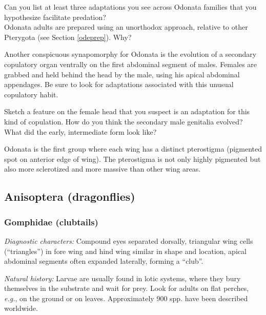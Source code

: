 \begin{theo}
{}Can you list at least three adaptations you see across Odonata families that you hypothesize facilitate predation?\\

\noindent{}Odonata adults are prepared using an unorthodox approach, relative to other Pterygota (see Section \ref{odeprep}). Why?
\end{theo}\vspace{3mm}

\noindent{}Another conspicuous synapomorphy for Odonata is the evolution of a secondary copulatory organ ventrally on the first abdominal segment of males. Females are grabbed and held behind the head by the male, using his apical abdominal appendages. Be sure to look for adaptations associated with this unusual copulatory habit.\vspace{3mm}

\begin{theo}
{}Sketch a feature on the female head that you suspect is an adaptation for this kind of copulation. How do you think the secondary male genitalia evolved? What did the early, intermediate form look like?
\end{theo}\vspace{3mm}

\noindent{}Odonata is the first group where each wing has a distinct pterostigma (pigmented spot on anterior edge of wing). The pterostigma is not only highly pigmented but also more sclerotized and more massive than other wing areas.\vspace{3mm}

\subsection{Anisoptera (dragonflies)}

\subsubsection{Gomphidae (clubtails)}
\noindent{}\textit{Diagnostic characters:} Compound eyes separated dorsally, triangular wing cells (``triangles'') in fore wing and hind wing similar in shape and location, apical abdominal segments often expanded laterally, forming a ``club''.\vspace{3mm}

\noindent{}\textit{Natural history:} Larvae are usually found in lotic systems, where they bury themselves in the substrate and wait for prey. Look for adults on flat perches, \textit{e.g.}, on the ground or on leaves. Approximately 900 spp. have been described worldwide.\vspace{3mm}

